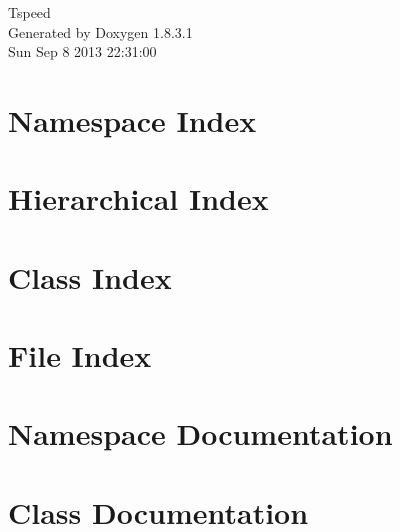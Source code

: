 \documentclass{book}
\begin{document}
\hypersetup{pageanchor=false,citecolor=blue}
\begin{titlepage}
\vspace*{7cm}
\begin{center}
{\Large Tspeed }\\
\vspace*{1cm}
{\large Generated by Doxygen 1.8.3.1}\\
\vspace*{0.5cm}
{\small Sun Sep 8 2013 22:31:00}\\
\end{center}
\end{titlepage}
\clearemptydoublepage
{}
\tableofcontents
\clearemptydoublepage
{}
\hypersetup{pageanchor=true,citecolor=blue}
\chapter{Namespace Index}

\chapter{Hierarchical Index}

\chapter{Class Index}

\chapter{File Index}

\chapter{Namespace Documentation}


\chapter{Class Documentation}

























\end{document}
